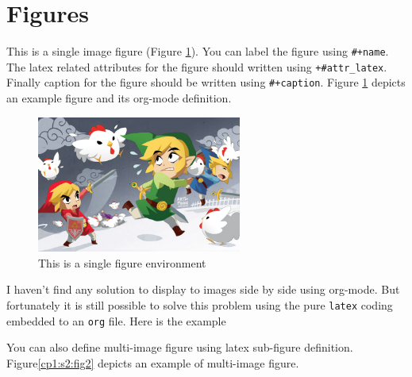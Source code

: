 \documentclass[12pt]{report}
\begin{document}
\section{Figures}
\label{cp1:s2}
This is a single image figure (Figure \ref{cp1:s2:fig1}). You can label the figure
using \texttt{\#+name}. The latex related attributes for the figure should written using
\texttt{+\#attr\_latex}. Finally caption for the figure should be written using
\texttt{\#+caption}. Figure \ref{cp1:s2:fig1} depicts an example figure and its org-mode
definition.

\begin{figure}[!ht]
\centering
\includegraphics[width=0.6\textwidth]{./figures/Sample/tumblr_static_eaceks0rfxsss8o4swscw40wo.jpg}
\caption{\label{cp1:s2:fig1}This is a single figure environment}
\end{figure}


I haven't find any solution to display to images side by side using org-mode.
But fortunately it is still possible to solve this problem using the pure \texttt{latex}
coding embedded to an \texttt{org} file. Here is the example

You can also define multi-image figure using latex sub-figure definition.
Figure\ref{cp1:s2:fig2} depicts an example of multi-image figure.
\end{document}
